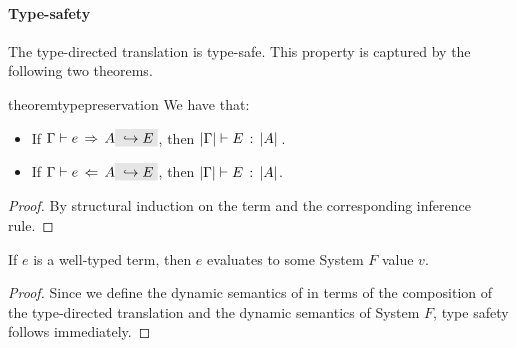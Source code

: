 

\paragraph{Type-safety}
The type-directed translation is type-safe. This property is captured
by the following two theorems.

\begin{restatable}{theorem}{typepreservation}
  \label{theorem:type-preservation}
  We have that:
  \begin{itemize}
  \item If $ \jinfer \Gamma e A \yields E $, 
        then $ \lvert \Gamma \rvert \vdash E \ \!:\! \ \lvert A \rvert \,$.
  \item If $ \jcheck \Gamma e A \yields E $, 
        then $ \lvert \Gamma \rvert \vdash E \ \!:\! \ \lvert A \rvert $.
  \end{itemize}

\end{restatable}

\begin{proof}
  By structural induction on the term and the corresponding inference rule.
\end{proof}

\begin{theorem}
  If $e$ is a well-typed \name term, then $e$ evaluates to some System $F$
  value $v$.
\end{theorem}

\begin{proof}
  Since we define the dynamic semantics of \name in terms of the composition of
  the type-directed translation and the dynamic semantics of System $F$, type safety follows immediately.
\end{proof}

%
%
%



